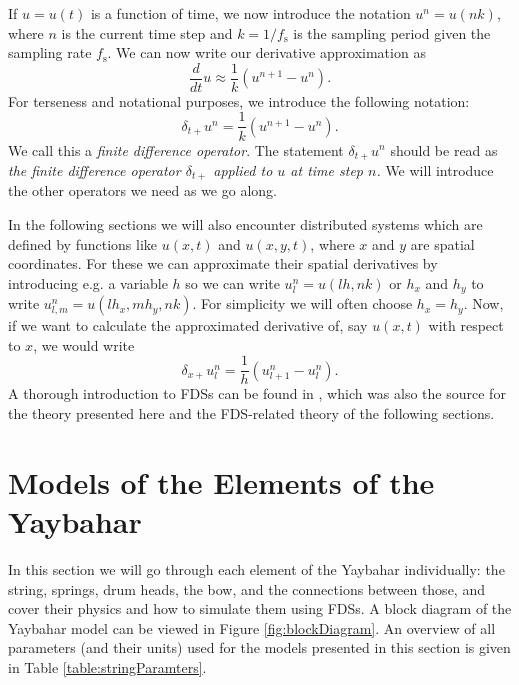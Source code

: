 \documentclass{article}
\begin{document}
If $u = u(t)$ is a function of time, we now introduce the notation $u^n = u(nk)$, where $n$ is the current time step and $k = 1/f_\text{s}$ is the sampling period given the sampling rate $f_\text{s}$.
We can now write our derivative approximation as
\begin{equation}
  \frac{d}{dt} u \approx \frac{1}{k} (u^{n+1} - u^{n}).
\end{equation}
For terseness and notational purposes, we introduce the following notation:
\begin{equation}
  \label{eq:dtf}
  \delta_{t+} u^n = \frac{1}{k} (u^{n+1} - u^{n}).
\end{equation}
We call this a \textit{finite difference operator}.
The statement $\delta_{t+}u^n$ should be read as \textit{the finite difference operator $\delta_{t+}$ applied to $u$ at time step $n$.}
We will introduce the other operators we need as we go along.

In the following sections we will also encounter distributed systems which are defined by functions like $u(x, t)$ and $u(x, y, t)$, where $x$ and $y$ are spatial coordinates.
For these we can approximate their spatial derivatives by introducing e.g. a variable $h$ so we can write $u^n_l = u(lh, nk)$ or $h_x$ and $h_y$ to write $u^n_{l, m} = u(lh_x, mh_y, nk)$. For simplicity we will often choose $h_x = h_y$.
Now, if we want to calculate the approximated derivative of, say $u(x, t)$ with respect to $x$, we would write
\begin{equation}
  \delta_{x+} u^n_l = \frac{1}{h} (u^n_{l+1} - u^n_{l}).
\end{equation}
A thorough introduction to FDSs can be found in \cite{bilbao_numerical_2009}, which was also the source for the theory presented here and the FDS-related theory of the following sections.

\section{Models of the Elements of the Yaybahar}
\label{sec:elements}

In this section we will go through each element of the Yaybahar individually: the string, springs, drum heads, the bow, and the connections between those, and cover their physics and how to simulate them using FDSs.
A block diagram of the Yaybahar model can be viewed in Figure \ref{fig:blockDiagram}.
An overview of all parameters (and their units) used for the models presented in this section is given in Table \ref{table:stringParamters}.
\end{document}
